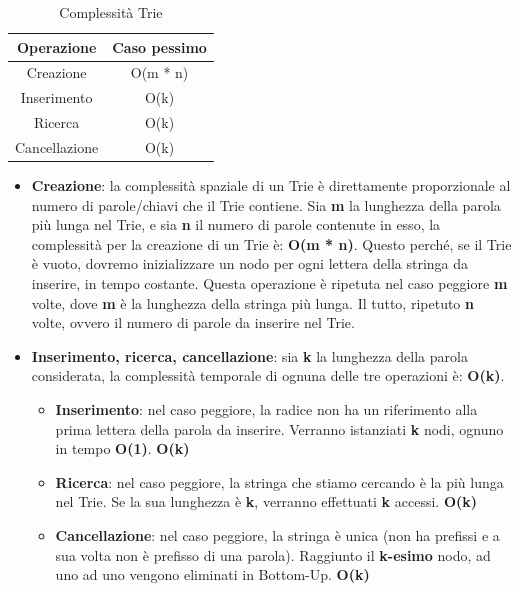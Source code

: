\documentclass[a4paper, 12pt]{article}
\begin{document}
\begin{table}[th!]
    \centering
    \begin{tabular}{|c|c|}
    \hline
        \textbf{Operazione} & \textbf{Caso pessimo} \\
    \hline
        Creazione & O(m * n) \\ 
    \hline
        Inserimento & O(k) \\
    \hline
        Ricerca & O(k) \\
    \hline
        Cancellazione & O(k) \\
    \hline
    \end{tabular}
    \caption{Complessità Trie}
    \label{tab:complexity}
\end{table}

\begin{itemize}
    \item \textbf{Creazione}: la complessità spaziale di un Trie è direttamente proporzionale al numero di parole/chiavi che il Trie contiene. Sia \textbf{m} la lunghezza della parola più lunga nel Trie, e sia \textbf{n} il numero di parole contenute in esso, la complessità per la creazione di un Trie è: \textbf{O(m * n)}. Questo perché, se il Trie è vuoto, dovremo inizializzare un nodo per ogni lettera della stringa da inserire, in tempo costante. Questa operazione è ripetuta nel caso peggiore \textbf{m} volte, dove \textbf{m} è la lunghezza della stringa più lunga. Il tutto, ripetuto \textbf{n} volte, ovvero il numero di parole da inserire nel Trie.
    
    \item \textbf{Inserimento, ricerca, cancellazione}: sia \textbf{k} la lunghezza della parola considerata, la complessità temporale di ognuna delle tre operazioni è: \textbf{O(k)}.
    \begin{itemize}
        \item \textbf{Inserimento}: nel caso peggiore, la radice non ha un riferimento alla prima lettera della parola da inserire. Verranno istanziati \textbf{k} nodi, ognuno in tempo \textbf{O(1)}. \textbf{O(k)}
        \item \textbf{Ricerca}: nel caso peggiore, la stringa che stiamo cercando è la più lunga nel Trie. Se la sua lunghezza è \textbf{k}, verranno effettuati \textbf{k} accessi. \textbf{O(k)}
        \item \textbf{Cancellazione}: nel caso peggiore, la stringa è unica (non ha prefissi e a sua volta non è prefisso di una parola). Raggiunto il \textbf{k-esimo} nodo, ad uno ad uno vengono eliminati in Bottom-Up. \textbf{O(k)}
    \end{itemize}
\end{itemize}
\end{document}
